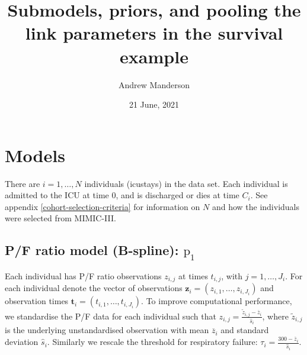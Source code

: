 \documentclass[
  10pt,
  a4paper,
]{article}
\title{Submodels, priors, and pooling the link parameters in the
survival example}
\author{Andrew Manderson}
\date{21 June, 2021}
\newcommand{\pd}{\text{p}}
\begin{document}
\maketitle

\hypertarget{models}{%
\section{Models}\label{models}}

There are \(i = 1, \ldots, N\) individuals (icustays) in the data set.
Each individual is admitted to the ICU at time \(0\), and is discharged
or dies at time \(C_{i}\). See appendix \ref{cohort-selection-criteria}
for information on \(N\) and how the individuals were selected from
MIMIC-III.

\hypertarget{pf-ratio-model-b-spline-pd_1}{%
\subsection{\texorpdfstring{P/F ratio model (B-spline):
\(\pd_{1}\)}{P/F ratio model (B-spline): \textbackslash pd\_\{1\}}}\label{pf-ratio-model-b-spline-pd_1}}

Each individual has P/F ratio observations \(z_{i, j}\) at times
\(t_{i, j}\), with \(j = 1, \ldots, J_{i}\). For each individual denote
the vector of observations
\(\boldsymbol{z}_{i} = (z_{i, 1}, \ldots, z_{i, J_{i}})\) and
observation times
\(\boldsymbol{t}_{i} = (t_{i, 1}, \ldots, t_{i, J_{i}})\). To improve
computational performance, we standardise the P/F data for each
individual such that
\(z_{i, j} = \frac{\tilde{z}_{i, j} - \overline{z}_{i}}{\hat{s}_{i}}\),
where \(\tilde{z}_{i, j}\) is the underlying unstandardised observation
with mean \(\overline{z}_{i}\) and standard deviation \(\hat{s}_{i}\).
Similarly we rescale the threshold for respiratory failure:
\(\tau_{i} = \frac{300 - \overline{z}_{i}}{\hat{s}_{i}}\).
\end{document}
